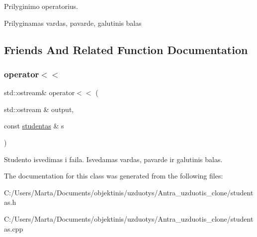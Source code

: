 Prilyginimo operatorius. 

Prilyginamas vardas, pavarde, galutinis balas 

\subsection{Friends And Related Function Documentation}
\mbox{\label{classstudentas_af8a3f13df24a4944124f75273a08e397}} 
\subsubsection{\texorpdfstring{operator$<$$<$}{operator<<}}
{\footnotesize\ttfamily std\+::ostream\& operator$<$$<$ (\begin{DoxyParamCaption}\item[{std\+::ostream \&}]{output,  }\item[{const \mbox{\hyperlink{classstudentas}{studentas}} \&}]{s }\end{DoxyParamCaption})\hspace{0.3cm}{\ttfamily [friend]}}

Studento isvedimas i faila. Isvedamas vardas, pavarde ir galutinis balas. 

The documentation for this class was generated from the following files\+:\begin{DoxyCompactItemize}
\item 
C\+:/\+Users/\+Marta/\+Documents/objektinis/uzduotys/\+Antra\+\_\+uzduotis\+\_\+clone/studentas.\+h\item 
C\+:/\+Users/\+Marta/\+Documents/objektinis/uzduotys/\+Antra\+\_\+uzduotis\+\_\+clone/studentas.\+cpp\end{DoxyCompactItemize}
